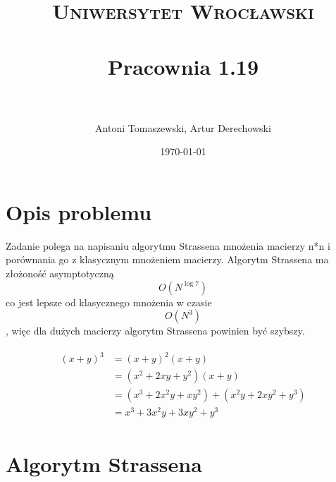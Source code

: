 \documentclass[paper=a4, fontsize=11pt]{scrartcl} %
\title{	
\normalfont \normalsize 
\textsc{Uniwersytet Wrocławski} \\ [25pt] %
\horrule{0.5pt} \\[0.4cm] %
\huge Pracownia 1.19 \\ %
\horrule{2pt} \\[0.5cm] %
}
\author{Antoni Tomaszewski, Artur Derechowski} %
\date{\normalsize\today} %
\numberwithin{equation}{section} %
\numberwithin{figure}{section} %
\numberwithin{table}{section} %
\begin{document}
\maketitle %


\section{Opis problemu}

Zadanie polega na napisaniu algorytmu Strassena mnożenia macierzy n*n  i porównania go z klasycznym mnożeniem macierzy. Algorytm Strassena ma złożoność asymptotyczną 
\[ O(N^{\log 7 } )\]
co jest lepsze od klasycznego mnożenia w czasie \[ O(N^{3} )\], więc dla dużych macierzy algorytm Strassena powinien być szybszy.

\begin{align} 
\begin{split}
(x+y)^3 	&= (x+y)^2(x+y)\\
&=(x^2+2xy+y^2)(x+y)\\
&=(x^3+2x^2y+xy^2) + (x^2y+2xy^2+y^3)\\
&=x^3+3x^2y+3xy^2+y^3
\end{split}					
\end{align}


\section{Algorytm Strassena}
\end{document}
